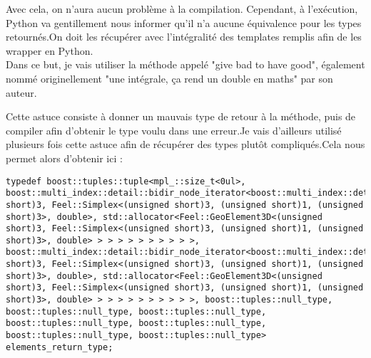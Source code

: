 \documentclass[12pt]{article}
\begin{document}
Avec cela, on n'aura aucun problème à la compilation. Cependant, à l'exécution, Python va gentillement nous informer qu'il n'a aucune équivalence pour les types retournés.On doit les récupérer avec l'intégralité des templates remplis afin de les wrapper en Python.\\
Dans ce but, je vais utiliser la méthode appelé "give bad to have good", également nommé originellement "une intégrale, ça rend un double en maths" par son auteur.

Cette astuce consiste à donner un mauvais type de retour à la méthode, puis de compiler afin d'obtenir le type voulu dans une erreur.Je vais d'ailleurs utilisé plusieurs fois cette astuce afin de récupérer des types plutôt compliqués.Cela nous permet alors d'obtenir ici :
\begin{lstlisting}
typedef boost::tuples::tuple<mpl_::size_t<0ul>, boost::multi_index::detail::bidir_node_iterator<boost::multi_index::detail::ordered_index_node<boost::multi_index::detail::ordered_index_node<boost::multi_index::detail::ordered_index_node<boost::multi_index::detail::ordered_index_node<boost::multi_index::detail::ordered_index_node<boost::multi_index::detail::ordered_index_node<boost::multi_index::detail::ordered_index_node<boost::multi_index::detail::index_node_base<Feel::GeoElement3D<(unsigned short)3, Feel::Simplex<(unsigned short)3, (unsigned short)1, (unsigned short)3>, double>, std::allocator<Feel::GeoElement3D<(unsigned short)3, Feel::Simplex<(unsigned short)3, (unsigned short)1, (unsigned short)3>, double> > > > > > > > > > >, boost::multi_index::detail::bidir_node_iterator<boost::multi_index::detail::ordered_index_node<boost::multi_index::detail::ordered_index_node<boost::multi_index::detail::ordered_index_node<boost::multi_index::detail::ordered_index_node<boost::multi_index::detail::ordered_index_node<boost::multi_index::detail::ordered_index_node<boost::multi_index::detail::ordered_index_node<boost::multi_index::detail::index_node_base<Feel::GeoElement3D<(unsigned short)3, Feel::Simplex<(unsigned short)3, (unsigned short)1, (unsigned short)3>, double>, std::allocator<Feel::GeoElement3D<(unsigned short)3, Feel::Simplex<(unsigned short)3, (unsigned short)1, (unsigned short)3>, double> > > > > > > > > > >, boost::tuples::null_type, boost::tuples::null_type, boost::tuples::null_type, boost::tuples::null_type, boost::tuples::null_type, boost::tuples::null_type, boost::tuples::null_type> elements_return_type;


\end{lstlisting}
\end{document}
